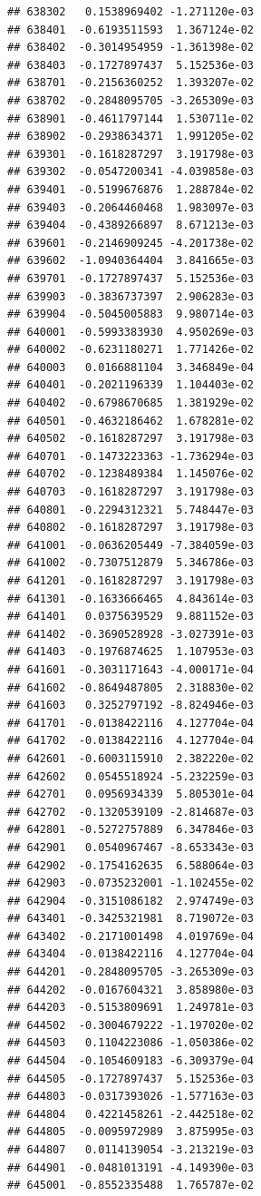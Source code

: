\begin{frame}[fragile]
\begin{verbatim}
## 638302   0.1538969402 -1.271120e-03
## 638401  -0.6193511593  1.367124e-02
## 638402  -0.3014954959 -1.361398e-02
## 638403  -0.1727897437  5.152536e-03
## 638701  -0.2156360252  1.393207e-02
## 638702  -0.2848095705 -3.265309e-03
## 638901  -0.4611797144  1.530711e-02
## 638902  -0.2938634371  1.991205e-02
## 639301  -0.1618287297  3.191798e-03
## 639302  -0.0547200341 -4.039858e-03
## 639401  -0.5199676876  1.288784e-02
## 639403  -0.2064460468  1.983097e-03
## 639404  -0.4389266897  8.671213e-03
## 639601  -0.2146909245 -4.201738e-02
## 639602  -1.0940364404  3.841665e-03
## 639701  -0.1727897437  5.152536e-03
## 639903  -0.3836737397  2.906283e-03
## 639904  -0.5045005883  9.980714e-03
## 640001  -0.5993383930  4.950269e-03
## 640002  -0.6231180271  1.771426e-02
## 640003   0.0166881104  3.346849e-04
## 640401  -0.2021196339  1.104403e-02
## 640402  -0.6798670685  1.381929e-02
## 640501  -0.4632186462  1.678281e-02
## 640502  -0.1618287297  3.191798e-03
## 640701  -0.1473223363 -1.736294e-03
## 640702  -0.1238489384  1.145076e-02
## 640703  -0.1618287297  3.191798e-03
## 640801  -0.2294312321  5.748447e-03
## 640802  -0.1618287297  3.191798e-03
## 641001  -0.0636205449 -7.384059e-03
## 641002  -0.7307512879  5.346786e-03
## 641201  -0.1618287297  3.191798e-03
## 641301  -0.1633666465  4.843614e-03
## 641401   0.0375639529  9.881152e-03
## 641402  -0.3690528928 -3.027391e-03
## 641403  -0.1976874625  1.107953e-03
## 641601  -0.3031171643 -4.000171e-04
## 641602  -0.8649487805  2.318830e-02
## 641603   0.3252797192 -8.824946e-03
## 641701  -0.0138422116  4.127704e-04
## 641702  -0.0138422116  4.127704e-04
## 642601  -0.6003115910  2.382220e-02
## 642602   0.0545518924 -5.232259e-03
## 642701   0.0956934339  5.805301e-04
## 642702  -0.1320539109 -2.814687e-03
## 642801  -0.5272757889  6.347846e-03
## 642901   0.0540967467 -8.653343e-03
## 642902  -0.1754162635  6.588064e-03
## 642903  -0.0735232001 -1.102455e-02
## 642904  -0.3151086182  2.974749e-03
## 643401  -0.3425321981  8.719072e-03
## 643402  -0.2171001498  4.019769e-04
## 643404  -0.0138422116  4.127704e-04
## 644201  -0.2848095705 -3.265309e-03
## 644202  -0.0167604321  3.858980e-03
## 644203  -0.5153809691  1.249781e-03
## 644502  -0.3004679222 -1.197020e-02
## 644503   0.1104223086 -1.050386e-02
## 644504  -0.1054609183 -6.309379e-04
## 644505  -0.1727897437  5.152536e-03
## 644803  -0.0317393026 -1.577163e-03
## 644804   0.4221458261 -2.442518e-02
## 644805  -0.0095972989  3.875995e-03
## 644807   0.0114139054 -3.213219e-03
## 644901  -0.0481013191 -4.149390e-03
## 645001  -0.8552335488  1.765787e-02

\end{verbatim}
\end{frame}
